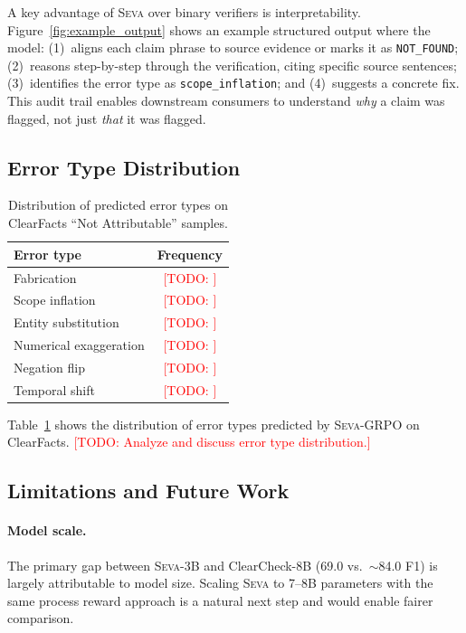 \documentclass{article}
\newcommand{\seva}{\textsc{Seva}}
\newcommand{\todo}[1]{\textcolor{red}{[TODO: #1]}}
\begin{document}
A key advantage of \seva{} over binary verifiers is interpretability.
Figure~\ref{fig:example_output} shows an example structured output where the model:
(1)~aligns each claim phrase to source evidence or marks it as \texttt{NOT\_FOUND};
(2)~reasons step-by-step through the verification, citing specific source sentences;
(3)~identifies the error type as \texttt{scope\_inflation}; and
(4)~suggests a concrete fix.
This audit trail enables downstream consumers to understand \emph{why} a claim was flagged, not just \emph{that} it was flagged.


\subsection{Error Type Distribution}

\begin{table}[t]
\centering
\caption{Distribution of predicted error types on ClearFacts ``Not Attributable'' samples.}
\label{tab:error_types}
\small
\begin{tabular}{lc}
\toprule
\textbf{Error type} & \textbf{Frequency} \\
\midrule
Fabrication & \todo{} \\
Scope inflation & \todo{} \\
Entity substitution & \todo{} \\
Numerical exaggeration & \todo{} \\
Negation flip & \todo{} \\
Temporal shift & \todo{} \\
\bottomrule
\end{tabular}
\end{table}

Table~\ref{tab:error_types} shows the distribution of error types predicted by \seva{}-GRPO on ClearFacts.
\todo{Analyze and discuss error type distribution.}


\subsection{Limitations and Future Work}

\paragraph{Model scale.}
The primary gap between \seva{}-3B and ClearCheck-8B (69.0 vs.\ $\sim$84.0 F1) is largely attributable to model size.
Scaling \seva{} to 7--8B parameters with the same process reward approach is a natural next step and would enable fairer comparison.
\end{document}
